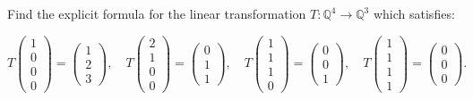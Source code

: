 \documentclass{eh-homework}
\begin{document}
    \newpage
    \begin{question}{3}
        Find the explicit formula for the linear transformation \( T : \mathbb{Q}^4 \to \mathbb{Q}^3 \) which satisfies:

        \[
        T\begin{pmatrix} 1 \\ 0 \\ 0 \\ 0 \end{pmatrix} = \begin{pmatrix} 1 \\ 2 \\ 3 \end{pmatrix}, \quad
        T\begin{pmatrix} 2 \\ 1 \\ 0 \\ 0 \end{pmatrix} = \begin{pmatrix} 0 \\ 1 \\ 1 \end{pmatrix}, \quad
        T\begin{pmatrix} 1 \\ 1 \\ 1 \\ 0 \end{pmatrix} = \begin{pmatrix} 0 \\ 0 \\ 1 \end{pmatrix}, \quad
        T\begin{pmatrix} 1 \\ 1 \\ 1 \\ 1 \end{pmatrix} = \begin{pmatrix} 0 \\ 0 \\ 0 \end{pmatrix}.
        \]
        \tcblower


\end{question}
\end{document}
